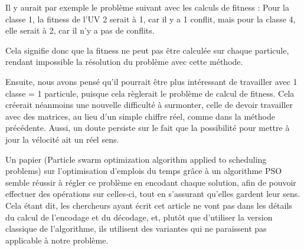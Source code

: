 Il y aurait par exemple le problème suivant avec les calculs de fitness : Pour la classe 1, la fitness de l'UV 2 serait à 1, car il y a 1 conflit, mais pour la classe 4, elle serait à 2, car il n'y a pas de conflits.

Cela signifie donc que la fitness ne peut pas être calculée sur chaque particule, rendant impossible la résolution du problème avec cette méthode.

Ensuite, nous avons pensé qu'il pourrait être plus intéressant de travailler avec 1 classe = 1 particule, puisque cela règlerait le problème de calcul de fitness.
Cela créerait néanmoins une nouvelle difficulté à surmonter, celle de devoir travailler avec des matrices, au lieu d'un simple chiffre réel, comme dans la méthode précédente.
Aussi, un doute persiste sur le fait que la possibilité pour mettre à jour la vélocité ait un réel sens.

Un papier (Particle swarm optimization algorithm applied to scheduling problems\cite{pongchairerks2009particle}) sur l'optimisation d'emplois du temps grâce à un algorithme PSO semble réussir à régler ce problème en encodant chaque solution, afin de pouvoir effectuer des opérations sur celles-ci, tout en s'assurant qu'elles gardent leur sens.
Cela étant dit, les chercheurs ayant écrit cet article ne vont pas dans les détails du calcul de l'encodage et du décodage, et, plutôt que d'utiliser la version classique de l'algorithme, ils utilisent des variantes qui ne paraissent pas applicable à notre problème.

